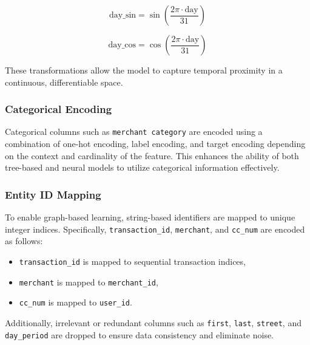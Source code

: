 \documentclass[conference]{IEEEtran}
\begin{document}
\begin{equation}
    \text{day\_sin} = \sin\left( \frac{2\pi \cdot \text{day}}{31} \right)
    \label{eq:day-sin}
\end{equation}

\begin{equation}
    \text{day\_cos} = \cos\left( \frac{2\pi \cdot \text{day}}{31} \right)
    \label{eq:day-cos}
\end{equation}


These transformations allow the model to capture temporal proximity in a continuous, differentiable space.

\subsubsection{Categorical Encoding}

Categorical columns such as \texttt{merchant category} are encoded using a combination of one-hot encoding, label encoding, and target encoding depending on the context and cardinality of the feature. This enhances the ability of both tree-based and neural models to utilize categorical information effectively.

\subsubsection{Entity ID Mapping}

To enable graph-based learning, string-based identifiers are mapped to unique integer indices. Specifically, \texttt{transaction\_id}, \texttt{merchant}, and \texttt{cc\_num} are encoded as follows:
\begin{itemize}
    \item \texttt{transaction\_id} is mapped to sequential transaction indices,
    \item \texttt{merchant} is mapped to \texttt{merchant\_id},
    \item \texttt{cc\_num} is mapped to \texttt{user\_id}.
\end{itemize}

Additionally, irrelevant or redundant columns such as \texttt{first}, \texttt{last}, \texttt{street}, and \texttt{day\_period} are dropped to ensure data consistency and eliminate noise.
\end{document}
